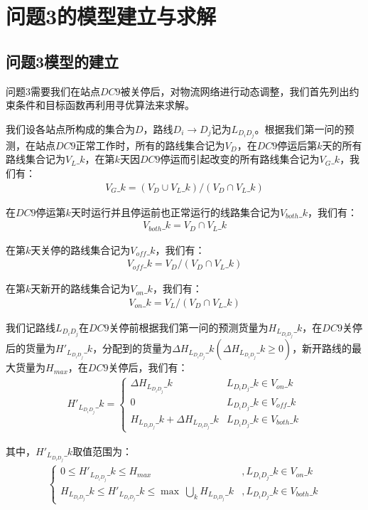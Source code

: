 \documentclass{MathorCupmodeling}
\begin{document}
\newpage
\section{问题3的模型建立与求解}
\subsection{问题3模型的建立}
问题3需要我们在站点$DC9$被关停后，对物流网络进行动态调整，我们首先列出约束条件和目标函数再利用寻优算法来求解。

我们设各站点所构成的集合为$D$，路线$D_i\to D_j$记为$L_{D_iD_j}$。根据我们第一问的预测，在站点$DC9$正常工作时，所有的路线集合记为$V_D$，在$DC9$停运后第$k$天的所有路线集合记为$V_L\_k$，在第$k$天因$DC9$停运而引起改变的所有路线集合记为$V_G\_k$，我们有：
\begin{eqnarray}
V_G\_k=(V_D\cup V_L\_k)/(V_D\cap V_L\_k)
\end{eqnarray}

在$DC9$停运第$k$天时运行并且停运前也正常运行的线路集合记为$V_{both}\_k$，我们有：
\begin{eqnarray}
V_{both}\_k=V_D\cap V_L\_k
\end{eqnarray}

在第$k$天关停的路线集合记为$V_{off}\_k$，我们有：
\begin{eqnarray}
V_{off}\_k=V_D/(V_D\cap V_L\_k)
\end{eqnarray}

在第$k$天新开的路线集合记为$V_{on}\_k$，我们有：
\begin{eqnarray}
V_{on}\_k=V_L/(V_D\cap V_L\_k)
\end{eqnarray}

我们记路线$L_{D_iD_j}$在$DC9$关停前根据我们第一问的预测货量为$H_{L_{D_iD_j}}\_k$，在$DC9$关停后的货量为$H'_{L_{D_iD_j}}\_k$，分配到的货量为$\Delta H_{L_{D_iD_j}}\_k(\Delta H_{L_{D_iD_j}}\_k\ge 0)$，新开路线的最大货量为$H_{max}$，在$DC9$关停后，我们有：
\begin{eqnarray}
H'_{L_{D_iD_j}}\_k=\left\{\begin{matrix}
 \Delta H_{L_{D_iD_j}}\_k&L_{D_iD_j}\_k\in V_{on}\_k \\
  0&L_{D_iD_j}\_k\in V_{off}\_k \\
  H_{L_{D_iD_j}}\_k+\Delta H_{L_{D_iD_j}}\_k&L_{D_iD_j}\_k\in V_{both}\_k
\end{matrix}\right.
\end{eqnarray}

其中，$H'_{L_{D_iD_j}}\_k$取值范围为：
\begin{eqnarray}\left\{\begin{matrix}
0\le H'_{L_{D_iD_j}}\_k\le H_{max}&,L_{D_iD_j}\_k\in V_{on}\_k\\ 
H_{L_{D_iD_j}}\_k\le H'_{L_{D_iD_j}}\_k\le \max \ \bigcup\limits_{k}H_{L_{D_iD_j}}\_k&,L_{D_iD_j}\_k\in V_{both}\_k\end{matrix}\right.
\end{eqnarray}
\end{document}
